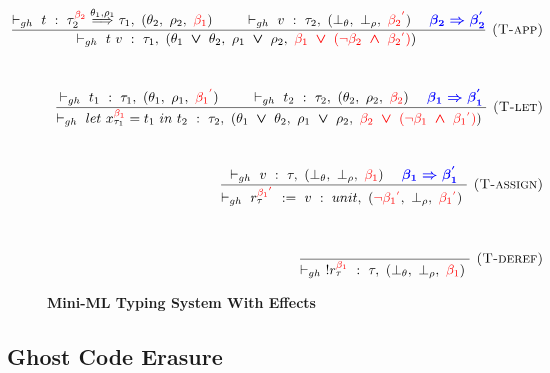 \documentclass[a4paper,11pt,oneside]{article}
\theoremstyle{plain}
\newcommand{\rouge}[1]{\textcolor{red}{#1}}
\newcommand{\bwedge}{\boldsymbol{~\wedge~}}
\newcommand{\bvee}{\boldsymbol{~\vee~}}
\newcommand{\ghosttyping}[6]{\vdash_{gh}~#1~:~#2,~(#3,~#4,~\rouge{#5})~\textcolor{blue}{\boldsymbol{#6}}}
\newcommand{\bth}{\bot_\theta}
\newcommand{\brh}{\bot_\rho}
\newcommand{\gba}[1]{\beta_{#1}}
\newcommand{\gbra}[1]{\textcolor{red}{\gba{#1}}}
\newcommand{\gbran}[1]{\textcolor{red}{\neg\gba{#1}}}
\begin{document}
\begin{figure}[H]
\begin{adjustwidth}{-5em}{5em}
\begin{small}
\begin{minipage}[t]{0.45\linewidth}
\begin{displaymath}
\begin{array}{l}
\end{array}
\end{displaymath}
\end{minipage} 
 \hfill 
\begin{minipage}[t]{0.55\linewidth}
\begin{displaymath}
\begin{array}{rrr}
\hspace*{-3cm}
\dfrac
	{
		\ghosttyping
			{t}
			{{\tau_{2}^{\gbra{2}} \stackrel{\theta_1, \rho_1}{\Longrightarrow} \tau_1}}
			{\theta_2}
			{\rho_2}
			{\gbra{1}}
			{} \qquad
		\ghosttyping
		{v}
		{\tau_2}
		{\bth}
		{\brh}
		{\gbra{2}^{\rouge{'}}}
		{\quad \gba{2} \Rightarrow \gba{2}^{'}}}
	{
		\ghosttyping
			{t~v}
			{\tau_1}
			{\theta_1 \bvee \theta_2}
			{\rho_1 \bvee \rho_2}
			{\gbra{1} \bvee (\gbran{2} \bwedge \gbra{2}^{\rouge{'}})}
			{}}
	{
		\textsc{  (T-app)}} \\[1.3cm]		
		
\dfrac
	{
		\ghosttyping
			{t_1}
			{\tau_1}
			{\theta_1}
			{\rho_1}
			{\gbra{1}^{\rouge{'}}}
			{} \qquad
		\ghosttyping
			{t_2}
			{\tau_2}
			{\theta_2}
			{\rho_2}
			{\gbra{2}}
			{\quad \gba{1} \Rightarrow \gba{1}^{'}}
	}
	{\ghosttyping
		{let~x^{\gbra{1}}_{\tau_1} = t_1~in~t_2}
		{\tau_2}
		{\theta_1 \bvee \theta_2}
		{\rho_1 \bvee \rho_2}
		{\gbra{2} \bvee (\gbran{1} \bwedge \gbra{1}^{\rouge{'}})}
		{}}
	{\textsc{  (T-let)}}\\[1.3cm]



\dfrac
	{\ghosttyping
		{v}
		{\tau}
		{\bth}
		{\brh}
		{\gbra{1}}
		{\quad \gba{1} \Rightarrow \gba{1}^{{'}}}}
	{\ghosttyping
		{r^{\gbra{1}^{\rouge{'}}}_{\tau}~:=~v}
		{unit}
		{\gbran{1}^{\rouge{'}}}	
		{\brh}
		{\gbra{1}^{\rouge{'}} }
		{}} 			
 	{\textsc{  (T-assign)}}	\\[1.5cm]		
   			
\dfrac
	{}
	{\ghosttyping{!r^{\gbra{1}}_{\tau}}{\tau}{\bth}{\brh}{\gbra{1}}{}} 
{\textsc{  (T-deref)}}


\end{array}
\end{displaymath}
\end{minipage} 	 		 
\end{small}
\end{adjustwidth}
\caption{\textbf{Mini-ML Typing System With Effects}}
\label{ghost-mini-ml-def-typ}	
\end{figure} 

\subsection{Ghost Code Erasure}
\end{document}
